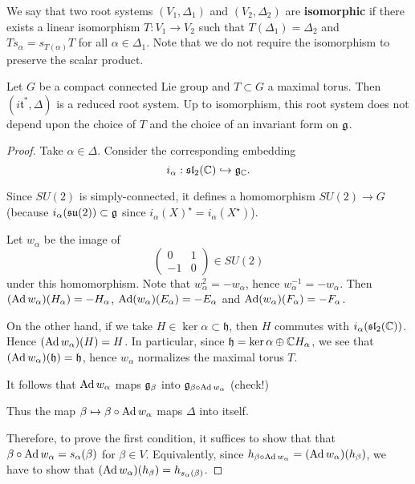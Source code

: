 \documentclass[11pt, english]{article}
\begin{document}
We say that two root systems $(V_1, \Delta_1)$ and $(V_2, \Delta_2)$ are \textbf{isomorphic} if there exists a linear isomorphism $T:V_1 \to V_2$ such that $T(\Delta_1)=\Delta_2$ and $T s_\alpha = s_{T(\alpha)} T$ for all $\alpha \in \Delta_1$. Note that we do not require the isomorphism to preserve the scalar product.

\begin{thm}
 Let $G$ be a compact connected Lie group and $T \subset G$ a maximal torus. Then $(i \mathfrak  t^\ast, \Delta)$ is a reduced root system. Up to isomorphism, this root system does not depend upon the choice of $T$ and the choice of an invariant form on $\mathfrak g$.
\end{thm}

\begin{proof}
Take $\alpha \in \Delta$. Consider the corresponding embedding
$$
i_\alpha:\mathfrak{sl}_2(\mathbb{C}) \hookrightarrow \mathfrak g_{\mathbb{C}}.
$$

Since $SU(2)$ is simply-connected, it defines a homomorphism $SU(2) \to G$  (because $i_\alpha(\mathfrak{su}(2)) \subset \mathfrak g$ since $i_\alpha(X)^\star = i_\alpha(X^\star)$). 

Let $w_\alpha$ be the image of 
$$
\begin{pmatrix}
0 & 1 \\
-1 & 0
\end{pmatrix} \in SU(2)
$$
under this homomorphism. Note that $w_\alpha^2 = -w_\alpha$, hence $w_\alpha^{-1}=-w_\alpha$. Then $(\operatorname{Ad} w_\alpha)(H_\alpha) = -H_\alpha$, $\operatorname{Ad}( w_\alpha)(E_\alpha)=-E_\alpha$ and $\operatorname{Ad}( w_\alpha)(F_\alpha)=-F_\alpha$. 

On the other hand, if we take $H \in \ker \alpha \subset \mathfrak h$, then $H$ commutes with $i_\alpha(\mathfrak{sl}_2(\mathbb{C}))$. Hence $(\operatorname{Ad} w_\alpha)(H) = H$. In particular, since $\mathfrak h = \ker \alpha \oplus \mathbb{C} H_\alpha$, we see that $(\operatorname{Ad} w_\alpha)(\mathfrak h) = \mathfrak h$, hence $w_\alpha$ normalizes the maximal torus $T$. 

It follows that $\operatorname{Ad} w_\alpha$ maps $\mathfrak g_\beta$ into $\mathfrak g_{\beta \circ \operatorname{Ad} w_\alpha}$ (check!)

Thus the map $\beta \mapsto \beta \circ \operatorname{Ad} w_\alpha$ maps $\Delta$ into itself.

Therefore, to prove the first condition, it suffices to show that that $\beta \circ \operatorname{Ad} w_\alpha = s_\alpha(\beta)$ for $\beta \in V$. Equivalently, since $h_{\beta \circ \operatorname{Ad} w_\alpha} = (\operatorname{Ad} w_\alpha)(h_\beta)$, we have to show that $(\operatorname{Ad} w_\alpha)(h_\beta) = h_{s_\alpha(\beta)}$.


\end{proof}
\end{document}

